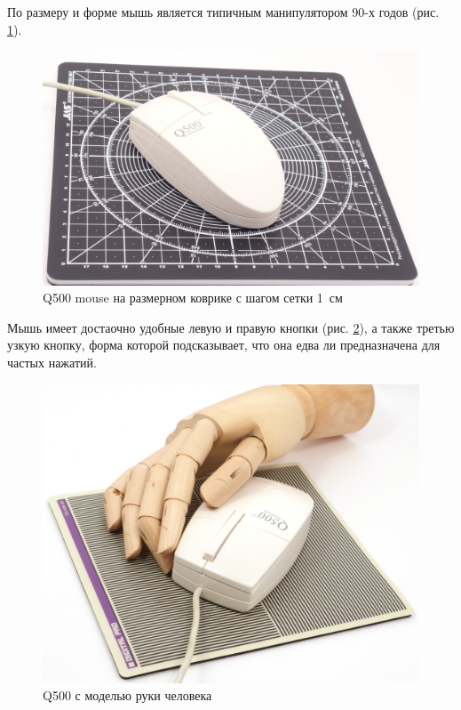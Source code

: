 \documentclass[11pt, a4paper]{article}
\begin{document}
По размеру и форме мышь является типичным манипулятором 90-х годов (рис. \ref{fig:q500mouseSize}).

\begin{figure}[h]
    \centering
    \includegraphics[scale=0.25]{1996_q500_mouse/size.jpg}
    \caption{Q500 mouse на размерном коврике с шагом сетки 1~см}
    \label{fig:q500mouseSize}
\end{figure}

Мышь имеет достаочно удобные левую и правую кнопки (рис. \ref{fig:q500mouseHand}), а также третью узкую кнопку, форма которой подсказывает, что она едва ли предназначена для частых нажатий.

\begin{figure}[h]
    \centering
    \includegraphics[scale=0.4]{1996_q500_mouse/hand_30.jpg}
    \caption{Q500 с моделью руки человека}
    \label{fig:q500mouseHand}
\end{figure}
\end{document}

